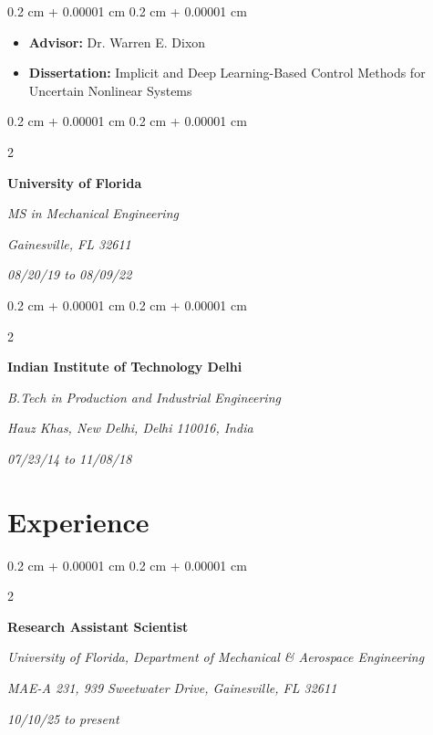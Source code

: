 \documentclass[10pt, letterpaper]{article}
\newenvironment{highlights}{
    \begin{itemize}[
        topsep=0.10 cm,
        parsep=0.10 cm,
        partopsep=0pt,
        itemsep=0pt,
        leftmargin=0.4 cm + 10pt
    ]
}{
    \end{itemize}
} %
\newenvironment{onecolentry}{
    \begin{adjustwidth}{
        0.2 cm + 0.00001 cm
    }{
        0.2 cm + 0.00001 cm
    }
}{
    \end{adjustwidth}
} %
\newenvironment{twocolentry}[2][]{
    \onecolentry
    \def\secondColumn{#2}
    \setcolumnwidth{\fill, 4.5 cm}
    \begin{paracol}{2}
}{
    \switchcolumn \raggedleft \secondColumn
    \end{paracol}
    \endonecolentry
} %
\begin{document}
        \vspace{0.05 cm}
        \begin{onecolentry}
            \begin{highlights}
                \setlength{\itemsep}{0pt} %
                \item \textbf{Advisor:} Dr. Warren E. Dixon
                \item \textbf{Dissertation:} Implicit and Deep Learning-Based Control Methods for Uncertain Nonlinear Systems
            \end{highlights}
        \end{onecolentry}


        \vspace{0.05 cm}

        \begin{twocolentry}{
            
            
        \textit{08/20/19 to 08/09/22}}
            \textbf{University of Florida}

            \textit{MS in Mechanical Engineering}
            
            \textit{Gainesville, FL 32611}
        \end{twocolentry}


        \vspace{0.05 cm}

        \begin{twocolentry}{
            
            
        \textit{07/23/14 to 11/08/18}}
            \textbf{Indian Institute of Technology Delhi}

            \textit{B.Tech in Production and Industrial Engineering}
            
            \textit{Hauz Khas, New Delhi, Delhi 110016, India}
        \end{twocolentry}




    
    \section{Experience}



        
        \begin{twocolentry}{
            
            
        \textit{10/10/25 to present}}
            \textbf{Research Assistant Scientist}
            
            \textit{University of Florida, Department of Mechanical \& Aerospace Engineering}
            
            \textit{MAE-A 231, 939 Sweetwater Drive, Gainesville, FL 32611}
        \end{twocolentry}
\end{document}
